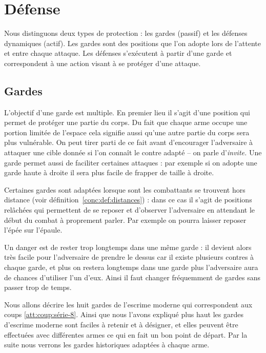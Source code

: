 \section{Défense}


Nous distinguons deux types de protection : les gardes (passif) et les défenses dynamiques (actif).
Les gardes sont des positions que l'on adopte lors de l'attente et entre chaque attaque.
Les défenses s'exécutent à partir d'une garde et correspondent à une action visant à se protéger d'une attaque.


\subsection{Gardes}


L'objectif d'une garde est multiple.
En premier lieu il s'agit d'une position qui permet de protéger une partie du corps.
Du fait que chaque arme occupe une portion limitée de l'espace cela signifie aussi qu'une autre partie du corps sera plus vulnérable.
On peut tirer parti de ce fait avant d'encourager l'adversaire à attaquer une cible donnée si l'on connaît le contre adapté -- on parle d'\emph{invite.}
Une garde permet aussi de faciliter certaines attaques : par exemple si on adopte une garde haute à droite il sera plus facile de frapper de taille à droite.

Certaines gardes sont adaptées lorsque sont les combattants se trouvent hors distance (voir définition~\ref{conc:def:distances}) : dans ce cas il s'agit de positions relâchées qui permettent de se reposer et d'observer l'adversaire en attendant le début du combat à proprement parler.
Par exemple on pourra laisser reposer l'épée sur l'épaule.

Un danger est de rester trop longtemps dans une même garde : il devient alors très facile pour l'adversaire de prendre le dessus car il existe plusieurs contres à chaque garde, et plus on restera longtemps dans une garde plus l'adversaire aura de chances d'utiliser l'un d'eux.
Ainsi il faut changer fréquemment de gardes sans passer trop de temps.

Nous allons décrire les huit gardes de l'escrime moderne qui correspondent aux coups \ref{att:coup:série-8}.
Ainsi que nous l'avons expliqué plus haut les gardes d'escrime moderne sont faciles à retenir et à désigner, et elles peuvent être effectuées avec différentes armes ce qui en fait un bon point de départ.
Par la suite nous verrons les gardes historiques adaptées à chaque arme.



